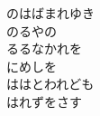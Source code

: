 \documentclass[10pt,b5j]{tarticle} %
\begin{document}
\begin{enumerate}
\begin{minipage}[c]{\blocksize}
        \vspace{\linespace}
        \item
        のはばまれゆき\\
        のるやの\\
        るるなかれを\\
        にめしを\\
        ははとわれども\\
        はれずをさす
    
    \end{minipage}
\end{enumerate} %
\end{document}

